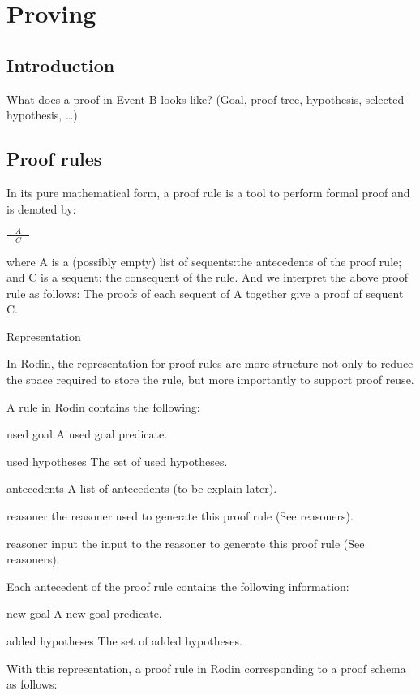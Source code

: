 \section{Proving}
\label{reference_04}

\subsection{Introduction}


What does a proof in Event-B looks like? (Goal, proof tree, hypothesis, selected hypothesis, \ldots)

\subsection{Proof rules}


In its pure mathematical form, a proof rule is a tool to perform formal proof and is denoted by: 

$\frac{\quad A\quad}{C}$

where A is a (possibly empty) list of sequents:the antecedents of the proof rule; and C is a sequent: the consequent of the rule. And we interpret the above proof rule as follows: The proofs of each sequent of A together give a proof of sequent C. 

Representation

In Rodin, the representation for proof rules are more structure not only to reduce the space required to store the rule, but more importantly to support proof reuse.

A rule in Rodin contains the following:

    used goal A used goal predicate. 

    used hypotheses The set of used hypotheses. 

    antecedents A list of antecedents (to be explain later). 

    reasoner the reasoner used to generate this proof rule (See reasoners). 

    reasoner input the input to the reasoner to generate this proof rule (See reasoners). 

Each antecedent of the proof rule contains the following information:

    new goal A new goal predicate. 

    added hypotheses The set of added hypotheses. 

With this representation, a proof rule in Rodin corresponding to a proof schema as follows: 

